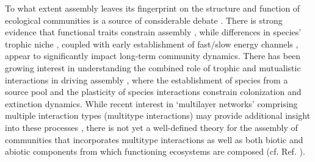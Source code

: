 \documentclass[twocolumn,preprintnumbers,amsmath,amssymb,superscriptaddress,linenumbers]{revtex4-1}
\begin{document}
To what extent assembly leaves its fingerprint on the structure and function of ecological communities is a source of considerable debate \cite{Hubbell2001,Tilman2004,Fukami2015}.
There is strong evidence that functional traits constrain assembly \cite{Kraft2008,ODwyer2009,Fukami2015}, while differences in species' trophic niche \cite{Brown2002,Piechnik2008}, coupled with early establishment of fast/slow energy channels \cite{Fahimipour2014}, appear to significantly impact long-term community dynamics.
There has been growing interest in understanding the combined role of trophic and mutualistic interactions in driving assembly \cite{Barbier2018,Campbell2011}, where the establishment of species from a source pool \cite{Luh1993,Law1996,Campbell2011} and the plasticity of species interactions \cite{Valdovinos2010,RamosJiliberto2012,Valdovinos2016,Ponisio2019} constrain colonization and extinction dynamics.
While recent interest in `multilayer networks' comprising multiple interaction types (multitype interactions) may provide additional insight into these processes \cite{Kefi2016,Pilosof2017}, there is not yet a well-defined theory for the assembly of communities that incorporates multitype interactions as well as both biotic and abiotic components from which functioning ecosystems are composed (cf. Ref. \cite{Odum1969}).

\end{document}
